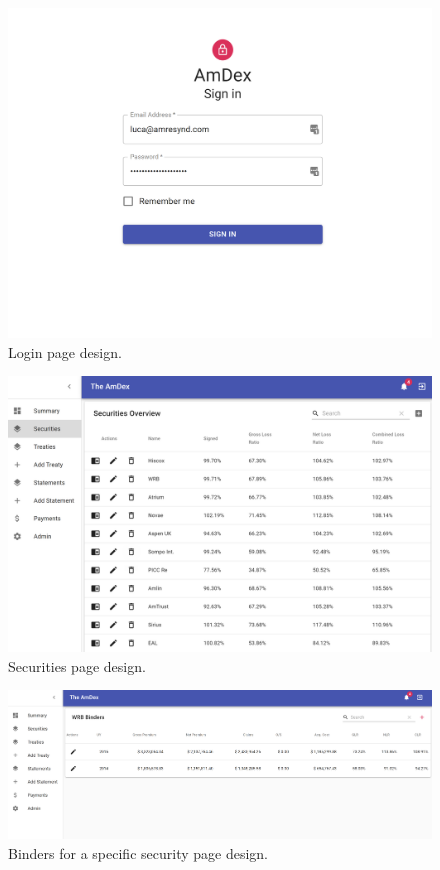 \documentclass[12pt]{article}
\begin{document}
\begin{figure}[H]
    \includegraphics[width=\linewidth]{login.png}
    \caption{Login page design.}
    \label{fig:login}
\end{figure}


\begin{figure}[H]
    \includegraphics[width=\linewidth]{securities.png}
    \caption{Securities page design.}
    \label{fig:securities}
\end{figure}

\begin{figure}[H]
    \includegraphics[width=\linewidth]{binders.png}
    \caption{Binders for a specific security page design.}
    \label{fig:binders}
\end{figure}
\end{document}
